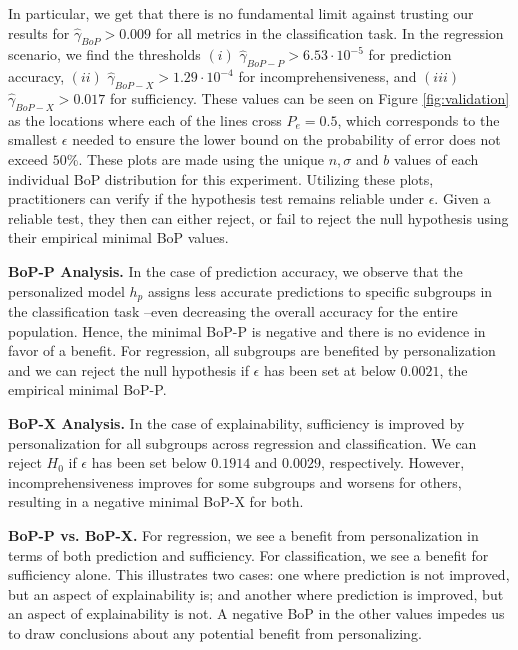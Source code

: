 In particular, we get that there is no fundamental limit against trusting our results for $\hat{\gamma}_{BoP} > 0.009$ for all metrics in the classification task. In the regression scenario, we find the thresholds $(i)$ $\hat{\gamma}_{BoP-P} > 6.53 \cdot 10^{-5}$ for prediction accuracy, $(ii)$ $\hat{\gamma}_{BoP-X} > 1.29 \cdot 10^{-4}$ for incomprehensiveness, and $(iii)$ $\hat{\gamma}_{BoP-X} > 0.017$ for sufficiency. These values can be seen on Figure \ref{fig:validation} as the locations where each of the lines cross ${P_e=0.5}$, which corresponds to the smallest $\epsilon$ needed to ensure the lower bound on the probability of error does not exceed $50\%$. These plots are made using the unique $n, \sigma$ and $b$ values of each individual BoP distribution for this experiment. Utilizing these plots, practitioners can verify if the hypothesis test remains reliable under $\epsilon$. Given a reliable test, they then can either reject, or fail to reject the null hypothesis using their empirical minimal BoP values. 



\textbf{BoP-P Analysis.} In the case of prediction accuracy, we observe that the personalized model $h_p$ assigns less accurate predictions to specific subgroups in the classification task --even decreasing the overall accuracy for the entire population. Hence, the minimal BoP-P is negative and there is no evidence in favor of a benefit. For regression, all subgroups are benefited by personalization and we can reject the null hypothesis if $\epsilon$ has been set at below $0.0021$, the empirical minimal BoP-P. 

\textbf{BoP-X Analysis.} In the case of explainability, sufficiency is improved by personalization for all subgroups across regression and classification. We can reject $H_0$ if $\epsilon$ has been set below $0.1914$ and $0.0029$, respectively. However, incomprehensiveness improves for some subgroups and worsens for others, resulting in a negative minimal BoP-X for both.



\textbf{BoP-P vs. BoP-X.} 
For regression, we see a benefit from personalization in terms of both prediction and sufficiency. For classification, we see a benefit for sufficiency alone. This illustrates two cases: one where prediction is not improved, but an aspect of explainability is; and another where prediction is improved, but an aspect of explainability is not. A negative BoP in the other values impedes us to draw conclusions about any potential benefit from personalizing.










